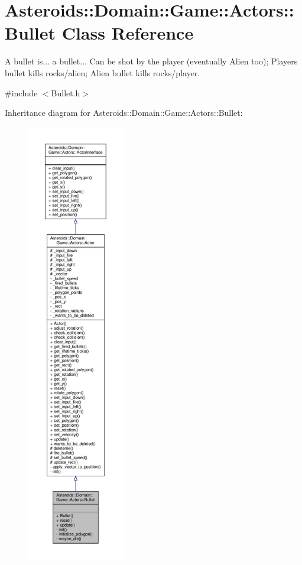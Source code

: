 \hypertarget{classAsteroids_1_1Domain_1_1Game_1_1Actors_1_1Bullet}{}\section{Asteroids\+:\+:Domain\+:\+:Game\+:\+:Actors\+:\+:Bullet Class Reference}
\label{classAsteroids_1_1Domain_1_1Game_1_1Actors_1_1Bullet}


A bullet is... a bullet... Can be shot by the player (eventually Alien too); Player\textquotesingle{}s bullet kills rocks/alien; Alien bullet kills rocks/player.  




{\ttfamily \#include $<$Bullet.\+h$>$}



Inheritance diagram for Asteroids\+:\+:Domain\+:\+:Game\+:\+:Actors\+:\+:Bullet\+:\nopagebreak
\begin{figure}[H]
\begin{center}
\leavevmode
\includegraphics[height=550pt]{classAsteroids_1_1Domain_1_1Game_1_1Actors_1_1Bullet__inherit__graph}
\end{center}
\end{figure}


